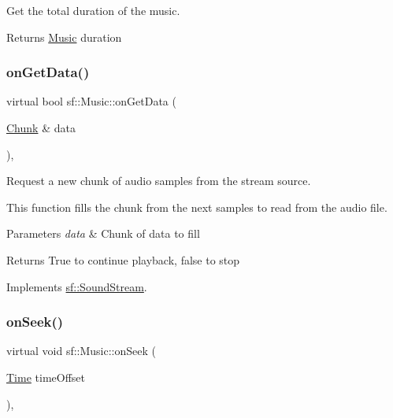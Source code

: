 Get the total duration of the music. 

\begin{DoxyReturn}{Returns}
\hyperlink{classsf_1_1_music}{Music} duration 
\end{DoxyReturn}
\mbox{\label{classsf_1_1_music_aca1bcb4e5d56a854133e74bd86374463}} 
\subsubsection{\texorpdfstring{on\+Get\+Data()}{onGetData()}}
{\footnotesize\ttfamily virtual bool sf\+::\+Music\+::on\+Get\+Data (\begin{DoxyParamCaption}\item[{\hyperlink{structsf_1_1_sound_stream_1_1_chunk}{Chunk} \&}]{data }\end{DoxyParamCaption})\hspace{0.3cm}{\ttfamily [protected]}, {\ttfamily [virtual]}}



Request a new chunk of audio samples from the stream source. 

This function fills the chunk from the next samples to read from the audio file.


\begin{DoxyParams}{Parameters}
{\em data} & Chunk of data to fill\\
\hline
\end{DoxyParams}
\begin{DoxyReturn}{Returns}
True to continue playback, false to stop 
\end{DoxyReturn}


Implements \hyperlink{classsf_1_1_sound_stream_a968ec024a6e45490962c8a1121cb7c5f}{sf\+::\+Sound\+Stream}.

\mbox{\label{classsf_1_1_music_a15119cc0419c16bb334fa0698699c02e}} 
\subsubsection{\texorpdfstring{on\+Seek()}{onSeek()}}
{\footnotesize\ttfamily virtual void sf\+::\+Music\+::on\+Seek (\begin{DoxyParamCaption}\item[{\hyperlink{classsf_1_1_time}{Time}}]{time\+Offset }\end{DoxyParamCaption})\hspace{0.3cm}{\ttfamily [protected]}, {\ttfamily [virtual]}}



